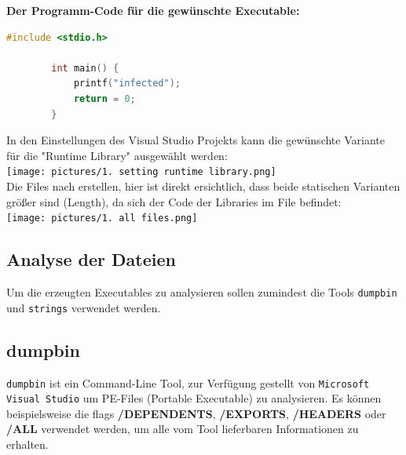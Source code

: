 \documentclass{article}
\begin{document}
	\noindent \textbf{Der Programm-Code für die gewünschte Executable:}\\
	\begin{lstlisting}[language=c]
		#include <stdio.h>
		
		int main() {
			printf("infected");
			return = 0;
		}
	\end{lstlisting}
	In den Einstellungen des Visual Studio Projekts kann die gewünschte Variante für die "Runtime Library" ausgewählt werden:\\
	\texttt{[image: pictures/1. setting runtime library.png]}\\
	Die Files nach erstellen, hier ist direkt ersichtlich, dass beide statischen Varianten größer sind (Length), da sich der Code der Libraries im File befindet:\\
	\texttt{[image: pictures/1. all files.png]}\\
	
	\pagebreak
	\subsection*{Analyse der Dateien}
	Um die erzeugten Executables zu analysieren sollen zumindest die Tools \texttt{dumpbin} und \texttt{strings} verwendet werden.\\
	\subsection*{dumpbin}
	\texttt{dumpbin} ist ein Command-Line Tool, zur Verfügung gestellt von \texttt{Microsoft Visual Studio} um PE-Files (Portable Executable) zu analysieren. Es können beispielsweise die flags \textbf{/DEPENDENTS}, \textbf{/EXPORTS}, \textbf{/HEADERS} oder \textbf{/ALL} verwendet werden, um alle vom Tool lieferbaren Informationen zu erhalten.\\
	
\end{document}
